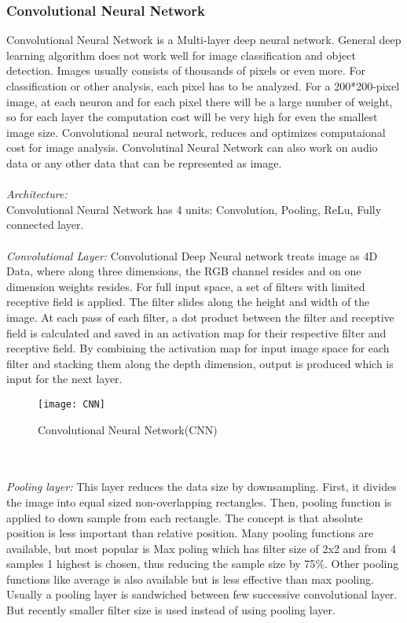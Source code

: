 \documentclass[conference]{IEEEtran}
\begin{document}
\subsubsection{Convolutional Neural Network}
Convolutional Neural Network is a Multi-layer deep neural network. General deep learning algorithm does not work well for image classification and object detection. Images usually consists of thousands of pixels or even more. For classification or other analysis, each pixel has to be analyzed. For a 200*200-pixel image, at each neuron and for each pixel there will be a large number of weight, so for each layer the computation cost will be very high for even the smallest image size. Convolutional neural network, reduces and optimizes computaional cost for image analysis. Convolutinal Neural Network can also work on audio data or any other data that can be represented as image.\\\\
\emph{Architecture:}\\
Convolutional Neural Network has 4 units: Convolution, Pooling, ReLu, Fully connected layer.\\\\
\emph{Convolutional Layer:} Convolutional Deep Neural network treats image as 4D Data, where along three dimensions, the RGB channel resides and on one dimension weights resides. For full input space, a set of filters with limited receptive field is applied. The filter slides along the height and width of the image. At each pass of each filter, a dot product between the filter and receptive field is calculated and saved in an activation map for their respective filter and receptive field. By combining the activation map for input image space for each filter and stacking them along the depth dimension, output is produced which is input for the next layer.
\begin{figure}[h]
\begin{center}
\texttt{[image: CNN]}
\end{center}
\caption{Convolutional Neural Network(CNN)}
\end{figure}\\\\
\emph{Pooling layer:} This layer reduces the data size by downsampling. First, it divides the image into equal sized non-overlapping rectangles. Then, pooling function is applied to down sample from each rectangle. The concept is that absolute position is less important than relative position. Many pooling functions are available, but most popular is Max poling which has filter size of 2x2 and from 4 samples 1 highest is chosen, thus reducing the sample size by 75$\%$. Other pooling functions like average is also available but is less effective than max pooling. Usually a pooling layer is sandwiched between few successive convolutional layer. But recently smaller filter size is used instead of using pooling layer.\\\\
\end{document}
